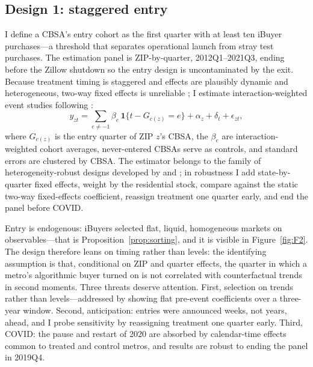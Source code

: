 \documentclass[12pt, letterpaper]{article}
\theoremstyle{remark}
\newcommand{\ind}[1]{\mathbf{1}\{#1\}}
\begin{document}
\subsection{Design 1: staggered entry}\label{sec:strategy-entry}

I define a CBSA's entry cohort as the first quarter with at least ten iBuyer purchases---a threshold that separates operational launch from stray test purchases. The estimation panel is ZIP-by-quarter, 2012Q1--2021Q3, ending before the Zillow shutdown so the entry design is uncontaminated by the exit. Because treatment timing is staggered and effects are plausibly dynamic and heterogeneous, two-way fixed effects is unreliable \citep{goodmanbacon2021difference, dechaisemartin2020two}; I estimate interaction-weighted event studies following \citet{sun2021estimating}:
\begin{equation}
y_{zt} = \sum_{e \neq -1} \beta_e \, \ind{t - G_{c(z)} = e} + \alpha_z + \delta_t + \epsilon_{zt},
\label{eq:entry}
\end{equation}
where $G_{c(z)}$ is the entry quarter of ZIP $z$'s CBSA, the $\beta_e$ are interaction-weighted cohort averages, never-entered CBSAs serve as controls, and standard errors are clustered by CBSA. The estimator belongs to the family of heterogeneity-robust designs developed by \citet{callaway2021difference} and \citet{borusyak2024revisiting}; in robustness I add state-by-quarter fixed effects, weight by the residential stock, compare against the static two-way fixed-effects coefficient, reassign treatment one quarter early, and end the panel before COVID.

Entry is endogenous: iBuyers selected flat, liquid, homogeneous markets on observables---that is Proposition~\ref{prop:sorting}, and it is visible in Figure~\ref{fig:F2}. The design therefore leans on timing rather than levels: the identifying assumption is that, conditional on ZIP and quarter effects, the quarter in which a metro's algorithmic buyer turned on is not correlated with counterfactual trends in second moments. Three threats deserve attention. First, selection on trends rather than levels---addressed by showing flat pre-event coefficients over a three-year window. Second, anticipation: entries were announced weeks, not years, ahead, and I probe sensitivity by reassigning treatment one quarter early. Third, COVID: the pause and restart of 2020 are absorbed by calendar-time effects common to treated and control metros, and results are robust to ending the panel in 2019Q4.
\end{document}
